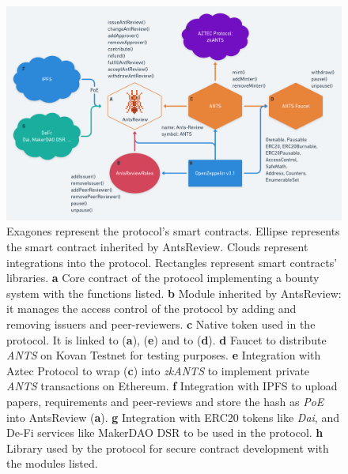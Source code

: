 \documentclass[runningheads]{llncs}
\begin{document}
\begin{figure}
\centering
\includegraphics[scale=0.28]{AntsReview}
\small{
\caption{Exagones represent the protocol's smart contracts. Ellipse represents the smart contract inherited by AntsReview. Clouds represent integrations into the protocol. Rectangles represent smart contracts' libraries.
\textbf{a} Core contract of the protocol implementing a bounty system with the functions listed.
\textbf{b} Module inherited by AntsReview: it manages the access control of the protocol by adding and removing issuers and peer-reviewers.
\textbf{c} Native token used in the protocol. It is linked to (\textbf{a}), (\textbf{e}) and to (\textbf{d}).
\textbf{d} Faucet to distribute \emph{ANTS} on Kovan Testnet for testing purposes. 
\textbf{e} Integration with Aztec Protocol to wrap (\textbf{c}) into \emph{zkANTS} to implement private \emph{ANTS} transactions on Ethereum.
\textbf{f} Integration with IPFS to upload papers, requirements and peer-reviews and store the hash as \emph{PoE} into AntsReview (\textbf{a}).
\textbf{g} Integration with ERC20 tokens like \emph{Dai}, and De-Fi services like MakerDAO DSR to be used in the protocol.
\textbf{h} Library used by the protocol for secure contract development with the modules listed.}}
\label{fig:contracts}
\end{figure}
\end{document}
